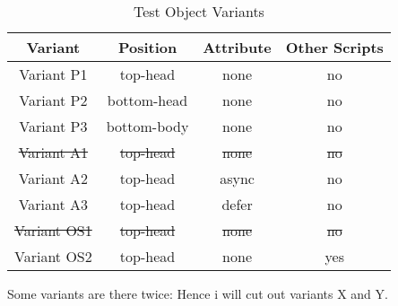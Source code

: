 \begin{table}[h]
	\small
	\centering
	\begin{tabular}{  | c || c | c | c | } 
	\hline
	Variant & Position & Attribute & Other Scripts \\
	\hline \hline
	Variant P1 & top-head & \cellcolor{lightgrey} none & \cellcolor{lightgrey} no \\
	   Variant P2 & bottom-head & \cellcolor{lightgrey} none & \cellcolor{lightgrey} no \\
	   Variant P3 & bottom-body & \cellcolor{lightgrey} none & \cellcolor{lightgrey} no \\
	  \hline
	   \sout{Variant A1} & \cellcolor{lightgrey} \sout{top-head} & \sout{none} & \cellcolor{lightgrey} \sout{no} \\
	   Variant A2 & \cellcolor{lightgrey} top-head & async & \cellcolor{lightgrey} no \\
	   Variant A3 & \cellcolor{lightgrey} top-head & defer & \cellcolor{lightgrey} no \\
	  \hline
	  \sout{Variant OS1} & \cellcolor{lightgrey} \sout{top-head} & \cellcolor{lightgrey} \sout{none} & \sout{no} \\
	  Variant OS2 & \cellcolor{lightgrey} top-head & \cellcolor{lightgrey} none & yes \\
	  \hline
	\end{tabular}
	\medskip
	\caption{Test Object Variants}
	\label{table:test_object_variants}
\end{table}


Some variants are there twice:
Hence i will cut out variants X and Y.






